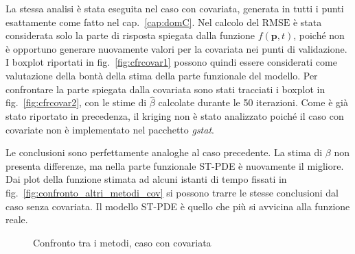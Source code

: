 \documentclass[a4paper,11pt,twoside,openright]{book}							%
\begin{document}
La stessa analisi è stata eseguita nel caso con covariata, generata in tutti i punti esattamente come fatto nel cap.~\ref{cap:domC}. Nel calcolo del $\mathrm{RMSE}$ è stata considerata solo la parte di risposta spiegata dalla funzione $f(\bm p,t)$, poiché non è opportuno generare nuovamente valori per la covariata nei punti di validazione. I boxplot riportati in fig.~\ref{fig:cfrcovar1} possono quindi essere considerati come valutazione della bontà della stima della parte funzionale del modello. Per confrontare la parte spiegata dalla covariata sono stati tracciati i boxplot in fig.~\ref{fig:cfrcovar2}, con le stime di $\hat{\beta}$ calcolate durante le 50 iterazioni. Come è già stato riportato in precedenza, il kriging non è stato analizzato poiché il caso con covariate non è implementato nel pacchetto \textit{gstat}.

Le conclusioni sono perfettamente analoghe al caso precedente. La stima di $\beta$ non presenta differenze, ma nella parte funzionale ST-PDE è nuovamente il migliore. Dai plot della funzione stimata ad alcuni istanti di tempo fissati in fig.~\ref{fig:confronto_altri_metodi_cov} si possono trarre le stesse conclusioni dal caso senza covariata. Il modello ST-PDE è quello che più si avvicina alla funzione reale.

\begin{figure}[t]
	\centering
	\caption{Confronto tra i metodi, caso con covariata}
	\label{fig:cfrcovar}
\end{figure}
\end{document}

